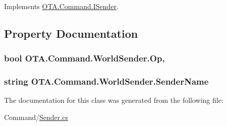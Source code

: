 Implements \hyperlink{interface_o_t_a_1_1_command_1_1_i_sender_a7e323ee3ab2f55876bc92a9d681d2bdf}{O\+T\+A.\+Command.\+I\+Sender}.



\subsection{Property Documentation}
\hypertarget{class_o_t_a_1_1_command_1_1_world_sender_ada3b598e15863bdc30f6048b64119de7}{}
\subsubsection[{Op}]{\setlength{\rightskip}{0pt plus 5cm}bool O\+T\+A.\+Command.\+World\+Sender.\+Op\hspace{0.3cm}{\ttfamily [get]}, {\ttfamily [set]}}\label{class_o_t_a_1_1_command_1_1_world_sender_ada3b598e15863bdc30f6048b64119de7}
\hypertarget{class_o_t_a_1_1_command_1_1_world_sender_a39565a0a172a88320b2e4b4559481c21}{}
\subsubsection[{Sender\+Name}]{\setlength{\rightskip}{0pt plus 5cm}string O\+T\+A.\+Command.\+World\+Sender.\+Sender\+Name\hspace{0.3cm}{\ttfamily [get]}}\label{class_o_t_a_1_1_command_1_1_world_sender_a39565a0a172a88320b2e4b4559481c21}


The documentation for this class was generated from the following file\+:\begin{DoxyCompactItemize}
\item 
Command/\hyperlink{_sender_8cs}{Sender.\+cs}\end{DoxyCompactItemize}
